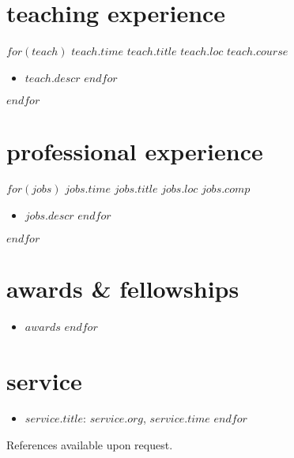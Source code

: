 \documentclass[]{friggeri-cv}
\begin{document}
\section{teaching experience}
\begin{entrylist}
$for(teach)$
  \entry
  {$teach.time$}
  {$teach.title$}
  {$teach.loc$}
  {$teach.course$}
  \setlength\parskip{0pt}
  \begin{itemize}[noitemsep, leftmargin=0.2in]
    $for(teach.descr)$
      \item $teach.descr$
    $endfor$
  \end{itemize}
  \setlength\parskip{12pt}
$endfor$
\end{entrylist}

\section{professional experience}
\begin{entrylist}
$for(jobs)$
  \entry
  {$jobs.time$}
  {$jobs.title$}
  {$jobs.loc$}
  {$jobs.comp$}
  \setlength\parskip{0pt}
  \begin{itemize}[noitemsep, leftmargin=0.2in]
    $for(jobs.descr)$
      \item $jobs.descr$
    $endfor$
  \end{itemize}
  \setlength\parskip{12pt}
$endfor$
\end{entrylist}



\section{awards \& fellowships}
\begin{itemize}[noitemsep, leftmargin=0.6in]
$for(awards)$
  \item $awards$
$endfor$
\end{itemize}



\section{service}
\begin{itemize}[noitemsep, leftmargin=0.6in]
$for(service)$
  \item $service.title$: $service.org$, $service.time$ 
$endfor$
\end{itemize}






\vspace{0.2in}
References available upon request.
\end{document}
